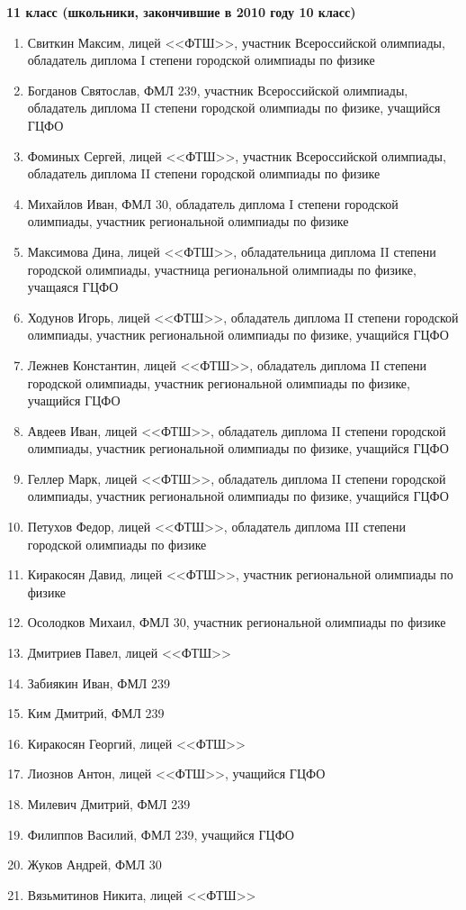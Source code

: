\textbf{11 класс (школьники, закончившие в 2010 году 10 класс)}
\begin{enumerate}
\item Свиткин Максим, лицей <<ФТШ>>, участник Всероссийской олимпиады,
  обладатель диплома I степени городской олимпиады по физике
\item Богданов Святослав, ФМЛ 239, участник Всероссийской олимпиады,
  обладатель диплома II степени городской олимпиады по физике,
  учащийся ГЦФО
\item Фоминых Сергей, лицей <<ФТШ>>, участник Всероссийской олимпиады,
  обладатель диплома II степени городской олимпиады по физике
\item Михайлов Иван, ФМЛ 30, обладатель диплома I степени городской
  олимпиады, участник региональной олимпиады по физике
\item Максимова Дина, лицей <<ФТШ>>, обладательница диплома II степени
  городской олимпиады, участница региональной олимпиады по физике,
  учащаяся ГЦФО
\item Ходунов Игорь, лицей <<ФТШ>>, обладатель диплома II степени
  городской олимпиады, участник региональной олимпиады по физике,
  учащийся ГЦФО
\item Лежнев Константин, лицей <<ФТШ>>, обладатель диплома II степени
  городской олимпиады, участник региональной олимпиады по физике,
  учащийся ГЦФО
\item Авдеев Иван, лицей <<ФТШ>>, обладатель диплома II степени
  городской олимпиады, участник региональной олимпиады по физике,
  учащийся ГЦФО
\item Геллер Марк, лицей <<ФТШ>>, обладатель диплома II степени
  городской олимпиады, участник региональной олимпиады по физике,
  учащийся ГЦФО
\item Петухов Федор, лицей <<ФТШ>>, обладатель диплома III степени
  городской олимпиады по физике
\item Киракосян Давид, лицей <<ФТШ>>, участник региональной олимпиады по физике
\item Осолодков Михаил, ФМЛ 30, участник региональной олимпиады по физике
\item Дмитриев Павел, лицей <<ФТШ>>
\item Забиякин Иван, ФМЛ 239	
\item Ким Дмитрий, ФМЛ 239
\item Киракосян Георгий, лицей <<ФТШ>>
\item Лиознов Антон, лицей <<ФТШ>>, учащийся ГЦФО
\item Милевич Дмитрий, ФМЛ 239
\item Филиппов Василий, ФМЛ 239, учащийся ГЦФО
\item Жуков Андрей, ФМЛ 30
\item Вязьмитинов Никита, лицей <<ФТШ>>
\end{enumerate}

